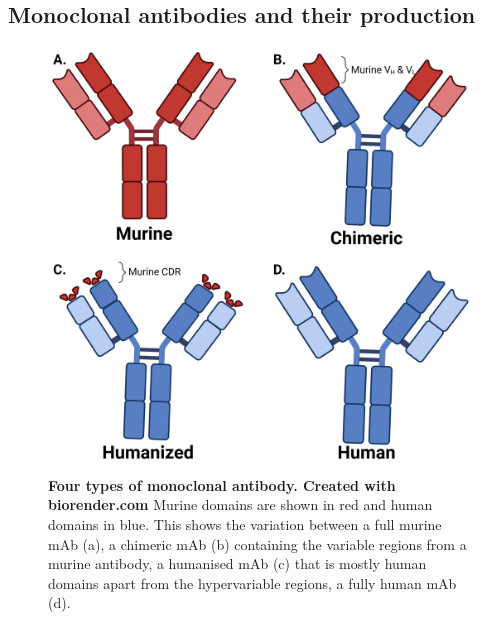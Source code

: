 \subsection{Monoclonal antibodies and their production}

\begin{figure}
    \centering
    \includegraphics[width=0.6\linewidth]{./images/mabstype.png}
    \caption{\textbf{Four types of monoclonal antibody. Created with biorender.com} Murine domains are shown in red and human domains in blue. This shows the variation between a full murine mAb (a), a chimeric mAb (b) containing the variable regions from a murine antibody, a humanised mAb (c) that is mostly human domains apart from the hypervariable regions, a fully human mAb (d).}
    \label{fig:mabstype}
\end{figure}
